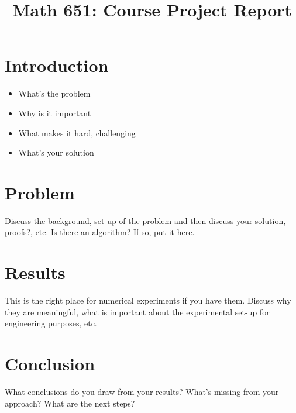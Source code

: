 \documentclass{amsart}
\title{Math 651: Course Project Report}
\author{}
\theoremstyle{definition}
\begin{document}
\maketitle

\section{Introduction}

\begin{itemize}
  \item What's the problem
  \item Why is it important
  \item What makes it hard, challenging
  \item What's your solution
\end{itemize}

\section{Problem}

Discuss the background, set-up of the problem and then discuss your solution,
proofs?, etc.  Is there an algorithm? If so, put it here.

\section{Results}

This is the right place for numerical experiments if you have them.  Discuss why
they are meaningful, what is important about the experimental set-up for
engineering purposes, etc.

\section{Conclusion}

What conclusions do you draw from your results?  What's missing from your
approach?  What are the next steps?



\end{document}
